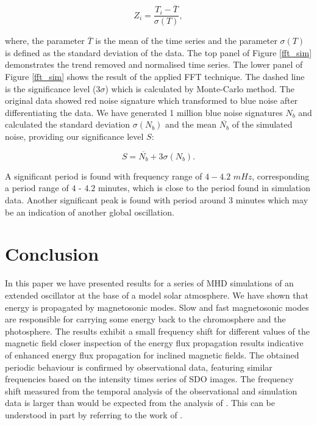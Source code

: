 \documentclass[linenumbers]{aastex63}
\begin{document}
\begin{equation}
	Z_{i} = \frac {T_{i} - \overline{T}}  {\sigma(T)},
	\label{z_score}
\end{equation}

where, the parameter $\overline{T}$ is the mean of the time series and the parameter $\sigma(T)$ is defined as the standard deviation of the data. The top panel of Figure \ref{fft_sim} demonstrates the trend removed and normalised time series. The lower panel of Figure \ref{fft_sim} shows the result of the applied FFT technique. The dashed line is the significance level ($3 \sigma$) which is calculated by Monte-Carlo method. The original data showed red noise signature which transformed to blue noise after differentiating the data. We have generated 1 million blue noise signatures $N_{b}$ and calculated the standard deviation $\sigma(N_{b})$ and the mean $\overline{N_{b}}$ of the simulated noise, providing our significance level $S$:

\begin{equation}
    S = \overline{N_{b}} + 3 \sigma(N_{b}).
\end{equation}

A significant period is found with frequency range of $4-4.2$ $mHz$, corresponding a period range of $4$ - $4.2$ minutes, which is close to the period found in simulation data. Another significant peak is found with period around $3$ minutes which may be an indication of another global oscillation.

\section{Conclusion}

In this paper we have presented results for a series of MHD simulations of an extended oscillator at the base of a model solar atmosphere. We have shown that energy is propagated by magnetosonic modes. Slow and fast magnetosonic modes are responsible for carrying some energy back to the chromosphere and the photosphere. The results exhibit a small frequency shift  for different values of the magnetic field closer inspection of the energy flux propagation results indicative of enhanced energy flux propagation for inclined magnetic fields. The obtained periodic behaviour is confirmed by observational data, featuring similar frequencies based on the intensity times series of SDO images. The frequency shift measured from the temporal analysis of the observational and simulation data is larger than would be expected from the analysis of \citet{Hindman1996}. This can be understood in part by referring to the work of \citet{Campbell1989}.
\end{document}
